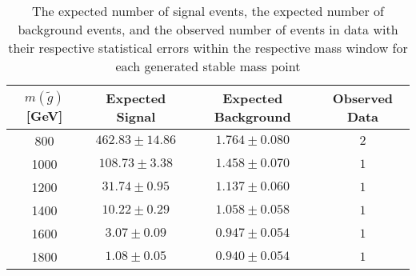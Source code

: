 \begin{table}[!htbp]
  \begin{center}
    \begin{tabular}{c|c|c|c}
      \hline
      $m(\tilde{g})$ [GeV]  & Expected Signal & Expected Background & Observed Data\\
      \hline
      800    & $462.83 \pm 14.86 $ & $1.764 \pm 0.080 $ & $2$ \\
      1000    & $108.73 \pm 3.38 $ & $1.458 \pm 0.070 $ & $1$ \\
      1200    & $31.74 \pm 0.95 $ & $1.137 \pm 0.060 $ &  $1$ \\
      1400    & $10.22 \pm 0.29 $ & $1.058 \pm 0.058 $ &  $1$ \\
      1600    & $3.07 \pm 0.09 $ & $0.947 \pm 0.054 $ &   $1$ \\
      1800    & $1.08 \pm 0.05 $ & $0.940 \pm 0.054 $ &   $1$ \\
      \hline
    \end{tabular}
  \end{center} 
  \caption{The expected number of signal events, the expected number of background events, and the observed number of events in data with their respective statistical errors within the respective mass window for each generated stable mass point}
  \label{tab:app_counts_stable}
\end{table}

